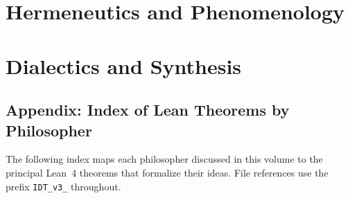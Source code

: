 \documentclass[11pt,oneside]{book}
\theoremstyle{plain}
\theoremstyle{definition}
\theoremstyle{remark}
\begin{document}


\part{Hermeneutics and Phenomenology}



\part{Dialectics and Synthesis}




\backmatter

\chapter*{Appendix: Index of Lean Theorems by Philosopher}

The following index maps each philosopher discussed in this volume to the
principal Lean~4 theorems that formalize their ideas. File references use
the prefix \texttt{IDT\_v3\_} throughout.
\end{document}
